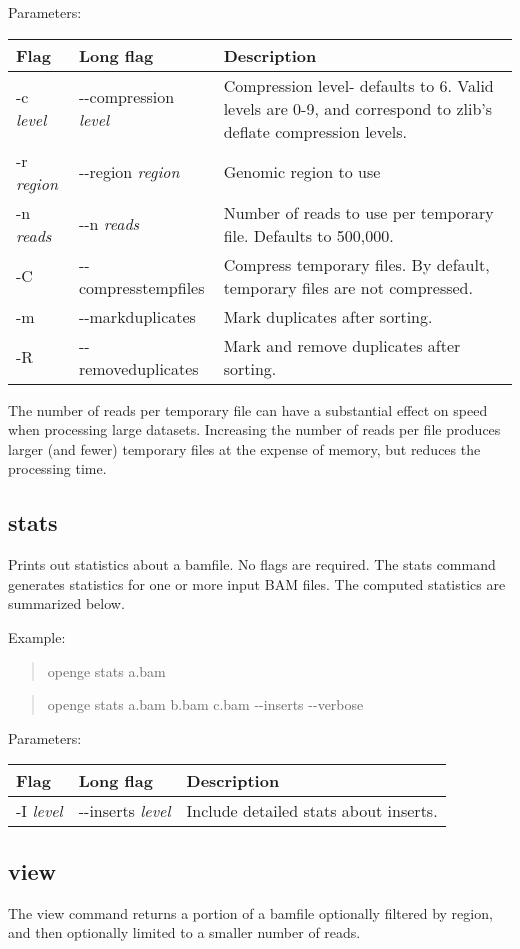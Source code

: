 \documentclass[11pt]{article}
\newcommand {\cmd}[1] {\begin{quote}#1\end{quote}}
\begin{document}
Parameters:
\begin{center}
\begin{tabular}{llp{3.5in}}
\hline
Flag&Long flag&Description\\ \hline
-c \textit{level}&{-}{-}compression \textit{level}&Compression level- defaults to 6. Valid levels are 0-9, and correspond to zlib's deflate compression levels. \\
-r \textit{region}&{-}{-}region \textit{region}&Genomic region to use\\
-n \textit{reads}&{-}{-}n \textit{reads}&Number of reads to use per temporary file. Defaults to 500,000.\\
-C&{-}{-}compresstempfiles&Compress temporary files. By default, temporary files are not compressed.\\
-m&{-}{-}markduplicates&Mark duplicates after sorting.\\
-R&{-}{-}removeduplicates&Mark and remove duplicates after sorting.\\
\end{tabular}
\end{center}

The number of reads per temporary file can have a substantial effect on speed when processing large datasets. Increasing the number of reads per file produces larger (and fewer) temporary files at the expense of memory, but reduces the processing time.

\subsection{stats}
Prints out statistics about a bamfile. No flags are required.
The stats command generates statistics for one or more input BAM files. The computed statistics are summarized below.

Example:

\cmd{openge stats a.bam}
\cmd{openge stats a.bam b.bam c.bam {-}{-}inserts {-}{-}verbose}
Parameters:
\begin{center}
\begin{tabular}{llp{3.5in}}
\hline
Flag&Long flag&Description\\ \hline
-I \textit{level}&{-}{-}inserts \textit{level}&Include detailed stats about inserts.\\
\end{tabular}
\end{center}

\subsection{view}
The view command returns a portion of a bamfile optionally filtered by region, and then optionally limited to a smaller number of reads.
\end{document}
